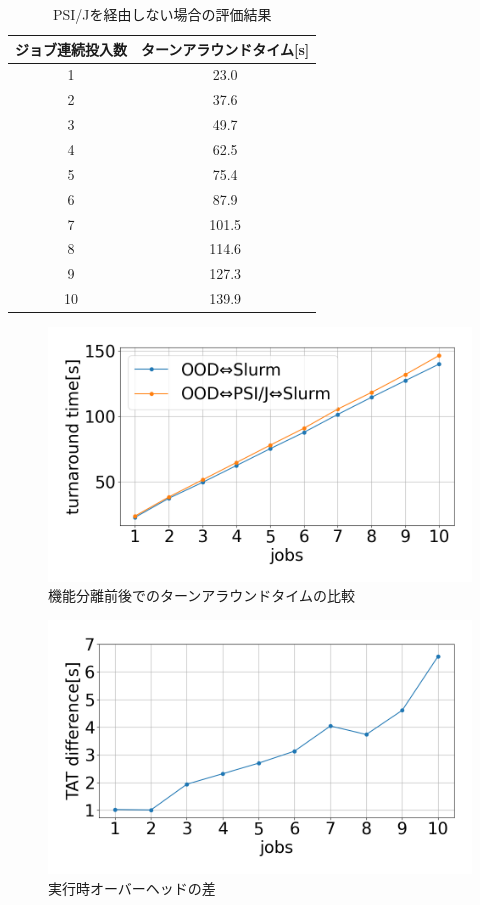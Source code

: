\begin{table}[tb]
    \centering
    \caption{PSI/Jを経由しない場合の評価結果}
    \begin{tabular}{|c|c|}
    \hline
    ジョブ連続投入数 & ターンアラウンドタイム{[}s{]} \\ \hline
    1        & 23.0               \\ \hline
    2        & 37.6               \\ \hline
    3        & 49.7               \\ \hline
    4        & 62.5               \\ \hline
    5        & 75.4               \\ \hline
    6        & 87.9               \\ \hline
    7        & 101.5              \\ \hline
    8        & 114.6              \\ \hline
    9        & 127.3              \\ \hline
    10       & 139.9              \\ \hline
    \end{tabular}
    \label{SLURM}
\end{table}

\begin{figure}[tb]
    \centering
    \includegraphics[width=120mm]{./fig/ave_1-20.png}
    \caption{機能分離前後でのターンアラウンドタイムの比較}
    \label{fig8}
\end{figure}
  
\begin{figure}[tb]
    \centering
    \includegraphics[width=120mm]{./fig/ave_diff_1-20.png}
    \caption{実行時オーバーヘッドの差}
    \label{fig9}
\end{figure}


